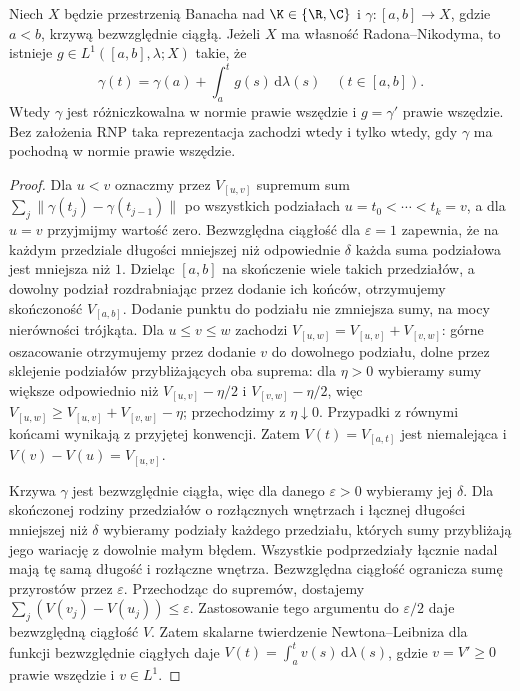 \begin{twierdzenie}
\label{thm:ac-curve-representation15b}
Niech $X$ będzie przestrzenią Banacha nad $\K\in\{\R,\C\}$
i $\gamma:[a,b]\to X$, gdzie $a<b$, krzywą bezwzględnie
ciągłą. Jeżeli $X$ ma własność Radona--Nikodyma, to
istnieje $g\in L^1([a,b],\lambda;X)$ takie, że
\[
 \gamma(t)=\gamma(a)+\int_a^t g(s)\,\mathrm d\lambda(s)
 \quad(t\in[a,b]).
\]
Wtedy $\gamma$ jest różniczkowalna w normie prawie
wszędzie i $g=\gamma'$ prawie wszędzie. Bez założenia
RNP taka reprezentacja zachodzi wtedy i tylko wtedy,
gdy $\gamma$ ma pochodną w normie prawie wszędzie.
\end{twierdzenie}
\begin{proof}
Dla $u<v$ oznaczmy przez $V_{[u,v]}$ supremum sum
$\sum_j\|\gamma(t_j)-\gamma(t_{j-1})\|$ po wszystkich
podziałach $u=t_0<\cdots<t_k=v$, a dla $u=v$ przyjmijmy
wartość zero. Bezwzględna ciągłość dla $\varepsilon=1$
zapewnia, że na każdym przedziale długości mniejszej
niż odpowiednie $\delta$ każda suma podziałowa jest
mniejsza niż $1$. Dzieląc $[a,b]$ na skończenie wiele
takich przedziałów, a dowolny podział rozdrabniając
przez dodanie ich końców, otrzymujemy skończoność
$V_{[a,b]}$. Dodanie punktu do podziału nie zmniejsza
sumy, na mocy nierówności trójkąta.
Dla $u\le v\le w$ zachodzi
$V_{[u,w]}=V_{[u,v]}+V_{[v,w]}$: górne oszacowanie
otrzymujemy przez dodanie $v$ do dowolnego podziału,
dolne przez sklejenie podziałów przybliżających oba
suprema: dla $\eta>0$ wybieramy sumy większe odpowiednio
niż $V_{[u,v]}-\eta/2$ i $V_{[v,w]}-\eta/2$, więc
$V_{[u,w]}\ge V_{[u,v]}+V_{[v,w]}-\eta$; przechodzimy
z $\eta\downarrow0$. Przypadki z równymi końcami
wynikają z przyjętej konwencji. Zatem $V(t)=V_{[a,t]}$ jest niemalejąca
i $V(v)-V(u)=V_{[u,v]}$.

Krzywa $\gamma$ jest bezwzględnie ciągła, więc dla
danego $\varepsilon>0$ wybieramy jej $\delta$.
Dla skończonej rodziny przedziałów o rozłącznych wnętrzach
i łącznej długości mniejszej niż $\delta$ wybieramy
podziały każdego przedziału, których sumy przybliżają
jego wariację z dowolnie małym błędem. Wszystkie
podprzedziały łącznie nadal mają tę samą długość
i rozłączne wnętrza. Bezwzględna ciągłość ogranicza
sumę przyrostów przez $\varepsilon$. Przechodząc do
supremów, dostajemy $\sum_j(V(v_j)-V(u_j))\le\varepsilon$.
Zastosowanie tego argumentu do $\varepsilon/2$ daje
bezwzględną ciągłość $V$. Zatem skalarne twierdzenie
Newtona--Leibniza dla funkcji bezwzględnie ciągłych daje
$V(t)=\int_a^t v(s)\,\mathrm d\lambda(s)$, gdzie
$v=V'\ge0$ prawie wszędzie i $v\in L^1$.


\end{proof}
